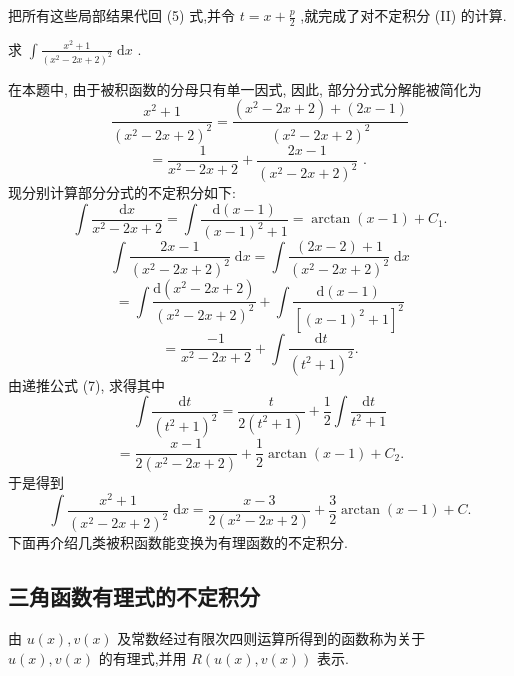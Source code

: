 把所有这些局部结果代回 (5) 式,并令 \(t = x + \frac{p}{2}\) ,就完成了对不定积分 (II) 的计算.

\begin{example}

\end{example}
求 \(\int \frac{{x}^{2} + 1}{{\left( {x}^{2} - 2x + 2\right) }^{2}}\mathrm{\;d}x\) .

\begin{solution}

\end{solution}
在本题中, 由于被积函数的分母只有单一因式, 因此, 部分分式分解能被简化为
\[
\frac{{x}^{2} + 1}{{\left( {x}^{2} - 2x + 2\right) }^{2}} = \frac{\left( {{x}^{2} - {2x} + 2}\right)  + \left( {{2x} - 1}\right) }{{\left( {x}^{2} - 2x + 2\right) }^{2}}
\]
\[
= \frac{1}{{x}^{2} - {2x} + 2} + \frac{{2x} - 1}{{\left( {x}^{2} - 2x + 2\right) }^{2}}\text{ . }
\]
现分别计算部分分式的不定积分如下:
\[
\int \frac{\mathrm{d}x}{{x}^{2} - {2x} + 2} = \int \frac{\mathrm{d}\left( {x - 1}\right) }{{\left( x - 1\right) }^{2} + 1} = \arctan \left( {x - 1}\right)  + {C}_{1}.
\]
\[
\int \frac{{2x} - 1}{{\left( {x}^{2} - 2x + 2\right) }^{2}}\mathrm{\;d}x = \int \frac{\left( {{2x} - 2}\right)  + 1}{{\left( {x}^{2} - 2x + 2\right) }^{2}}\mathrm{\;d}x
\]
\[
= \int \frac{\mathrm{d}\left( {{x}^{2} - {2x} + 2}\right) }{{\left( {x}^{2} - 2x + 2\right) }^{2}} + \int \frac{\mathrm{d}\left( {x - 1}\right) }{{\left\lbrack  {\left( x - 1\right) }^{2} + 1\right\rbrack  }^{2}}
\]
\[
= \frac{-1}{{x}^{2} - {2x} + 2} + \int \frac{\mathrm{d}t}{{\left( {t}^{2} + 1\right) }^{2}}.
\]
由递推公式 (7), 求得其中
\[
\int \frac{\mathrm{d}t}{{\left( {t}^{2} + 1\right) }^{2}} = \frac{t}{2\left( {{t}^{2} + 1}\right) } + \frac{1}{2}\int \frac{\mathrm{d}t}{{t}^{2} + 1}
\]
\[
= \frac{x - 1}{2\left( {{x}^{2} - {2x} + 2}\right) } + \frac{1}{2}\arctan \left( {x - 1}\right)  + {C}_{2}.
\]
于是得到
\[
\int \frac{{x}^{2} + 1}{{\left( {x}^{2} - 2x + 2\right) }^{2}}\mathrm{\;d}x = \frac{x - 3}{2\left( {{x}^{2} - {2x} + 2}\right) } + \frac{3}{2}\arctan \left( {x - 1}\right)  + C.
\]
下面再介绍几类被积函数能变换为有理函数的不定积分.

\subsection{三角函数有理式的不定积分}

由 \(u\left( x\right) ,v\left( x\right)\) 及常数经过有限次四则运算所得到的函数称为关于 \(u\left( x\right) ,v\left( x\right)\) 的有理式,并用 \(R\left( {u\left( x\right) ,v\left( x\right) }\right)\) 表示.

